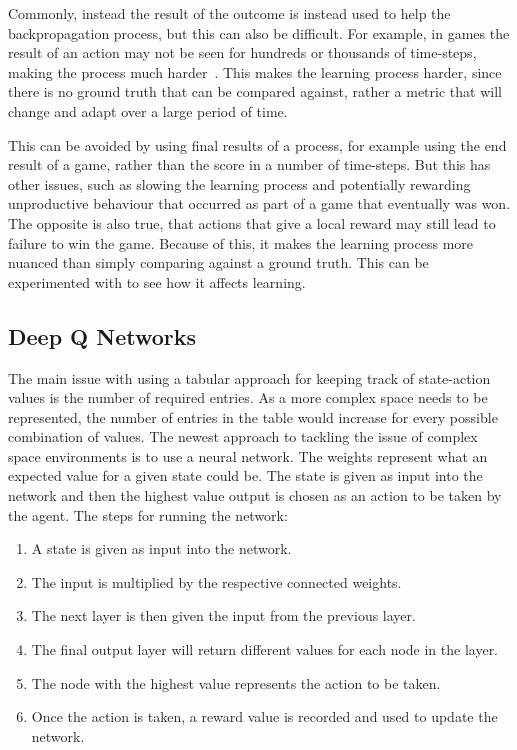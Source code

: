 Commonly, instead the result of the outcome is instead used to help the
backpropagation process, but this can also be difficult. For example,
in games the result of an action may not be seen for hundreds or thousands
of time-steps, making the process much harder~\cite{sutton1984temporal}.
This makes the learning process harder, since there is no ground truth
that can be compared against, rather a metric that will change and adapt
over a large period of time.

This can be avoided by using final results of a process, for example using the
end result of a game, rather than the score in a number of time-steps. But this
has other issues, such as slowing the learning process and potentially rewarding
unproductive behaviour that occurred as part of a game that eventually was won.
The opposite is also true, that actions that give a local reward may still lead
to failure to win the game. Because of this, it makes the learning process more
nuanced than simply comparing against a ground truth. This can be experimented
with to see how it affects learning.

\subsection{Deep Q Networks}

The main issue with using a tabular approach for keeping track of state-action
values is the number of required entries. As a more complex space needs to be
represented, the number of entries in the table would increase for every
possible combination of values. The newest approach to tackling the issue of
complex space environments is to use a neural network. The weights represent
what an expected value for a given state could be. The state is given as input
into the network and then the highest value output is chosen as an action to be
taken by the agent. The steps for running the network:

\begin{enumerate}
    \item A state is given as input into the network.
    \item The input is multiplied by the respective connected weights.
    \item The next layer is then given the input from the previous layer.
    \item The final output layer will return different values for each node in
        the layer.
    \item The node with the highest value represents the action to be taken.
    \item Once the action is taken, a reward value is recorded and used to
        update the network.
\end{enumerate}

